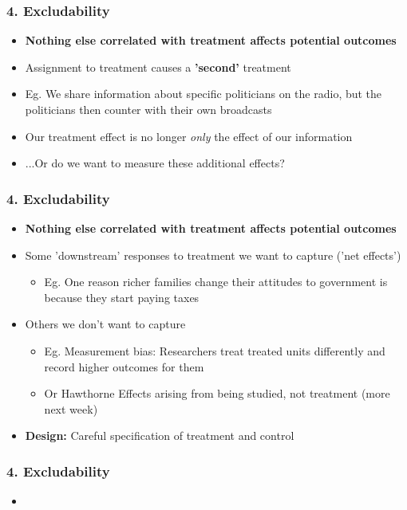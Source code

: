 \documentclass[xcolor=x11names,compress]{beamer}\usepackage[]{graphicx}\usepackage[]{color}
\renewcommand{\(}{\begin{columns}}
\renewcommand{\)}{\end{columns}}
\newcommand{\<}[1]{\begin{column}{#1}}
\renewcommand{\>}{\end{column}}
\begin{document}
\begin{frame}
\frametitle{4. Excludability}
\begin{itemize}
\item \textbf{Nothing else correlated with treatment affects potential outcomes}
\pause
\item Assignment to treatment causes a \textbf{'second'} treatment
\pause
\item Eg. We share information about specific politicians on the radio, but the politicians then counter with their own broadcasts
\pause
\item Our treatment effect is no longer \textit{only} the effect of our information
\pause
\item ...Or do we want to measure these additional effects?
\end{itemize}
\end{frame}

\begin{frame}
\frametitle{4. Excludability}
\begin{itemize}
\item \textbf{Nothing else correlated with treatment affects potential outcomes}
\pause
\item Some 'downstream' responses to treatment we want to capture ('net effects')
\begin{itemize}
\item Eg. One reason richer families change their attitudes to government is because they start paying taxes
\end{itemize}
\pause
\item Others we don't want to capture
\begin{itemize}
\item Eg. Measurement bias: Researchers treat treated units differently and record higher outcomes for them
\pause
\item Or Hawthorne Effects arising from being studied, not treatment (more next week)
\end{itemize}
\item \textbf{Design:} Careful specification of treatment and control
\end{itemize}
\end{frame}

\begin{frame}
\frametitle{4. Excludability}
\begin{itemize}
\item 
\end{itemize}
\end{frame}
\end{document}
